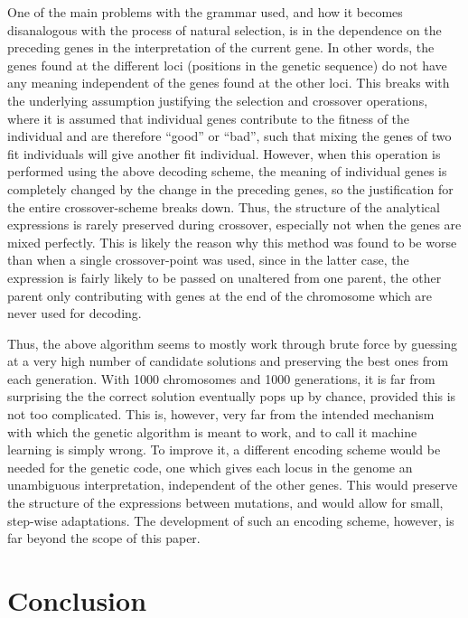 \documentclass[multicolumn, 12pt]{extarticle}
\begin{document}
One of the main problems with the grammar used, and how it becomes disanalogous with the process of natural selection, is in the dependence on the preceding genes in the interpretation of the current gene. In other words, the genes found at the different loci (positions in the genetic sequence) do not have any meaning independent of the genes found at the other loci. This breaks with the underlying assumption justifying the selection and crossover operations, where it is assumed that individual genes contribute to the fitness of the individual and are therefore ``good'' or ``bad'', such that mixing the genes of two fit individuals will give another fit individual. However, when this operation is performed using the above decoding scheme, the meaning of individual genes is completely changed by the change in the preceding genes, so the justification for the entire crossover-scheme breaks down. Thus, the structure of the analytical expressions is rarely preserved during crossover, especially not when the genes are mixed perfectly. This is likely the reason why this method was found to be worse than when a single crossover-point was used, since in the latter case, the expression is fairly likely to be passed on unaltered from one parent, the other parent only contributing with genes at the end of the chromosome which are never used for decoding. 

Thus, the above algorithm seems to mostly work through brute force by guessing at a very high number of candidate solutions and preserving the best ones from each generation. With 1000 chromosomes and 1000 generations, it is far from surprising the the correct solution eventually pops up by chance, provided this is not too complicated. This is, however, very far from the intended mechanism with which the genetic algorithm is meant to work, and to call it machine learning is simply wrong. To improve it, a different encoding scheme would be needed for the genetic code, one which gives each locus in the genome an unambiguous interpretation, independent of the other genes. This would preserve the structure of the expressions between mutations, and would allow for small, step-wise adaptations. The development of such an encoding scheme, however, is far beyond the scope of this paper.  


\section{Conclusion}



\end{document}
